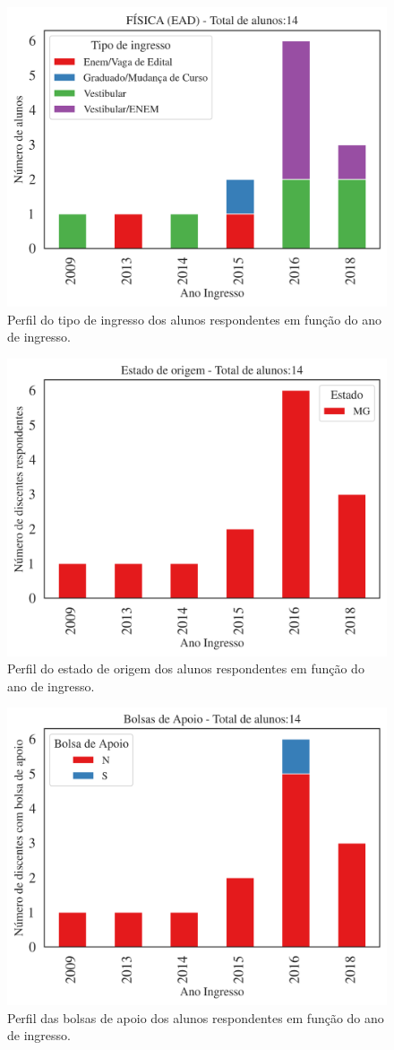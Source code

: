 \documentclass[a4paper,10pt]{article}
\begin{document}
\begin{figure}[h]
\centering
\includegraphics[width=0.7\linewidth]{ingresso_discentes_curso_tipo_113527.png}
\caption{\label{fig:tipo_ingresso_ano}  Perfil  do tipo de ingresso dos alunos respondentes  em função do ano de ingresso.}
\end{figure}

\begin{figure}[h]
\centering
\includegraphics[width=0.7\linewidth]{quantitativos_estado_de_origem_113527.png}
\caption{\label{fig:estado_ano} Perfil do estado de origem dos alunos respondentes em função do ano de ingresso.}
\end{figure}

\begin{figure}[h]
\centering
\includegraphics[width=0.7\linewidth]{quantitativos_bolsa_de_apoio_113527.png}
\caption{\label{fig:bolsa_ano} Perfil das bolsas de apoio  dos alunos respondentes em função do ano de ingresso.}
\end{figure}
\end{document}
